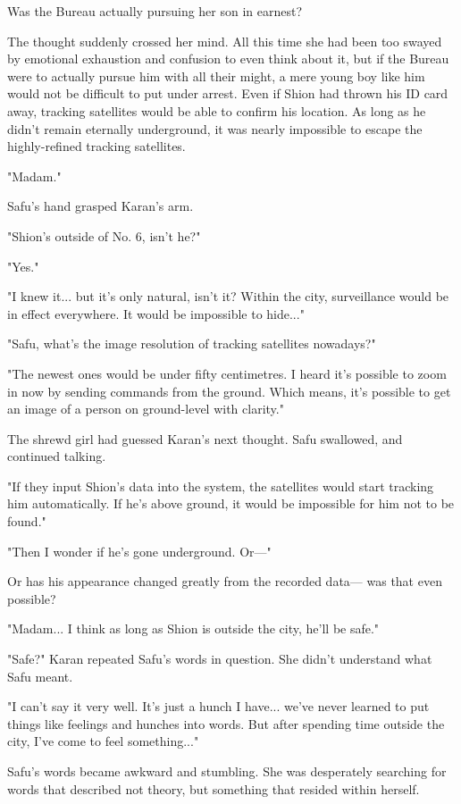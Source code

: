 Was the Bureau actually pursuing her son in earnest?

The thought suddenly crossed her mind. All this time she had been too
swayed by emotional exhaustion and confusion to even think about it, but
if the Bureau were to actually pursue him with all their might, a mere
young boy like him would not be difficult to put under arrest. Even if
Shion had thrown his ID card away, tracking satellites would be able to
confirm his location. As long as he didn't remain eternally underground,
it was nearly impossible to escape the highly-refined tracking
satellites.

"Madam."

Safu's hand grasped Karan's arm.

"Shion's outside of No. 6, isn't he?"

"Yes."

"I knew it... but it's only natural, isn't it? Within the city,
surveillance would be in effect everywhere. It would be impossible to
hide..."

"Safu, what's the image resolution of tracking satellites nowadays?"

"The newest ones would be under fifty centimetres. I heard it's possible
to zoom in now by sending commands from the ground. Which means, it's
possible to get an image of a person on ground-level with clarity."

The shrewd girl had guessed Karan's next thought. Safu swallowed, and
continued talking.

"If they input Shion's data into the system, the satellites would start
tracking him automatically. If he's above ground, it would be impossible
for him not to be found."

"Then I wonder if he's gone underground. Or---"

Or has his appearance changed greatly from the recorded data--- was that
even possible?

"Madam... I think as long as Shion is outside the city, he'll be safe."

"Safe?" Karan repeated Safu's words in question. She didn't understand
what Safu meant.

"I can't say it very well. It's just a hunch I have... we've never
learned to put things like feelings and hunches into words. But after
spending time outside the city, I've come to feel something..."

Safu's words became awkward and stumbling. She was desperately searching
for words that described not theory, but something that resided within
herself.


